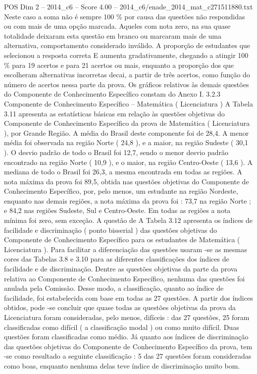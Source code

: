 \begin{textsample}{POS Dim 2 – 2014\_c6 – Score 4.00 – 2014\_c6/enade\_2014\_mat\_c271511880.txt}
Neste caso a soma não é sempre 100 \% por causa das questões não respondidas ou com mais de uma opção marcada.
Aqueles com nota zero, na sua quase totalidade deixaram esta questão em branco ou marcaram mais de uma alternativa, comportamento considerado inválido.
A proporção de estudantes que selecionou a resposta correta E aumenta gradativamente, chegando a atingir 100 \% para 19 acertos e para 21 acertos ou mais, enquanto a proporção dos que escolheram alternativas incorretas decai, a partir de três acertos, como função do número de acertos nessa parte da prova.
Os gráficos relativos às demais questões do Componente de Conhecimento Específico constam do Anexo I. 3.2.3 Componente de Conhecimento Específico – Matemática ( Licenciatura ) A Tabela 3.11 apresenta as estatísticas básicas em relação às questões objetivas do Componente de Conhecimento Específico da prova de Matemática ( Licenciatura ), por Grande Região.
A média do Brasil deste componente foi de 28,4.
A menor média foi observada na região Norte ( 24,8 ), e a maior, na região Sudeste ( 30,1 ).
O desvio padrão de todo o Brasil foi 12,7, sendo o menor desvio padrão encontrado na região Norte ( 10,9 ), e o maior, na região Centro-Oeste ( 13,6 ).
A mediana de todo o Brasil foi 26,3, a mesma encontrada em todas as regiões.
A nota máxima da prova foi 89,5, obtida nas questões objetivas do Componente de Conhecimento Específico, por, pelo menos, um estudante na região Nordeste, enquanto nas demais regiões, a nota máxima da prova foi : 73,7 na região Norte ; e 84,2 nas regiões Sudeste, Sul e Centro-Oeste.
Em todas as regiões a nota mínima foi zero, sem exceção.
A questão de A Tabela 3.12 apresenta os índices de facilidade e discriminação ( ponto bisserial ) das questões objetivas do Componente de Conhecimento Específico para os estudantes de Matemática ( Licenciatura ).
Para facilitar a diferenciação das questões usaram -se as mesmas cores das Tabelas 3.8 e 3.10 para as diferentes classificações dos índices de facilidade e de discriminação.
Dentre as questões objetivas da parte da prova relativa ao Componente de Conhecimento Específico, nenhuma das questões foi anulada pela Comissão.
Desse modo, a classificação, quanto ao índice de facilidade, foi estabelecida com base em todas as 27 questões.
A partir dos índices obtidos, pode -se concluir que quase todas as questões objetivas da prova da Licenciatura foram consideradas, pelo menos, difíceis : das 27 questões, 25 foram classificadas como difícil ( a classificação modal ) ou como muito difícil.
Duas questões foram classificadas como médio.
Já quanto aos índices de discriminação das questões objetivas do Componente de Conhecimento Específico da prova, tem -se como resultado a seguinte classificação : 5 das 27 questões foram consideradas como boas, enquanto nenhuma delas teve índice de discriminação muito bom.

\end{textsample}
